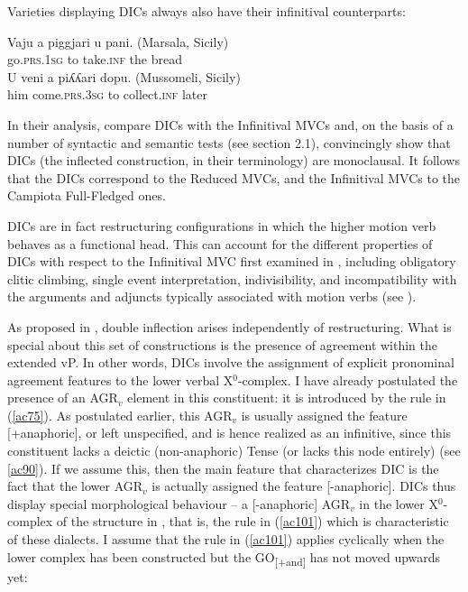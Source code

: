 \documentclass[output=paper]{langscibook}
\begin{document}
Varieties displaying DICs always also have their infinitival counterparts:

\ea \label{ac99}\gll Vaju    a  piggjari u     pani.    (Marsala, Sicily)\\
go.\textsc{prs}.\textsc{1sg} to  take.\textsc{inf} the    bread \\
\ex \label{ac100}\gll U   veni      a   piʎʎari   dopu.   (Mussomeli, Sicily)\\
him  come.\textsc{prs}.\textsc{3sg} to   collect.\textsc{inf} later\\
\z

In their analysis, \citet{cardinaletti2001a} compare DICs with the Infinitival MVCs and, on the basis of a number of syntactic and semantic tests (see section 2.1), convincingly show that DICs (the inflected construction, in their terminology) are monoclausal. It follows that the DICs correspond to the Reduced MVCs, and the Infinitival MVCs to the Campiota Full-Fledged ones.

DICs are in fact restructuring configurations in which the higher motion verb behaves as a functional head. This can account for the different properties of DICs with respect to the Infinitival MVC first examined in \citet{cardinaletti2001a}, including obligatory clitic climbing, single event interpretation, indivisibility, and incompatibility with the arguments and adjuncts typically associated with motion verbs (see \citealt{cardinaletti2001a, cardinaletti2003a, manzini2005a, cruschina2013a, caro2019a}).

As proposed in \citet{cruschina2021a}, double inflection arises independently of restructuring. What is special about this set of constructions is the presence of agreement within the extended vP. In other words, DICs involve the assignment of explicit pronominal agreement features to the lower verbal X$^0$-complex. I have already postulated the presence of an  AGR$_v$ element in this constituent: it is introduced by the rule in (\ref{ac75}).  As postulated earlier, this AGR$_v$ is usually assigned the feature [+anaphoric], or left unspecified, and is hence realized as an infinitive, since this constituent lacks a deictic (non-anaphoric) Tense (or lacks this node entirely) (see \ref{ac90}). If we assume this, then the main feature that characterizes DIC is the fact that the lower AGR$_v$ is actually assigned the feature [-anaphoric]. DICs thus display special morphological behaviour  --  a [-anaphoric] AGR$_v$ in the lower X$^0$-complex of the structure in , that is, the rule in (\ref{ac101}) which is characteristic of these dialects. I assume that the rule in (\ref{ac101}) applies cyclically when the lower complex has been constructed but the GO\textsubscript{[+and]} has not moved upwards yet:
\end{document}
